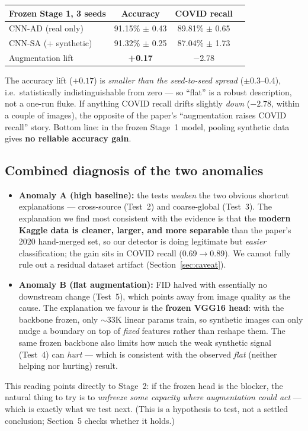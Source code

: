\documentclass[11pt]{article}
\begin{document}
\begin{table}[htbp]
\centering
\begin{tabular}{@{}lccc@{}}
\toprule
\textbf{Frozen Stage 1, 3 seeds} & \textbf{Accuracy} & \textbf{COVID recall} & \\
\midrule
CNN-AD (real only)   & 91.15\% $\pm$ 0.43 & 89.81\% $\pm$ 0.65 & \\
CNN-SA (+ synthetic) & 91.32\% $\pm$ 0.25 & 87.04\% $\pm$ 1.73 & \\
Augmentation lift    & \textbf{+0.17} & $-$2.78 & \\
\bottomrule
\end{tabular}
\end{table}

\noindent The accuracy lift ($+0.17$) is \emph{smaller than the seed-to-seed
spread} ($\pm$0.3--0.4), i.e.\ statistically indistinguishable from zero --- so
``flat'' is a robust description, not a one-run fluke. If anything COVID recall
drifts slightly \emph{down} ($-2.78$, within a couple of images), the opposite of
the paper's ``augmentation raises COVID recall'' story. Bottom line: in the frozen
Stage~1 model, pooling synthetic data gives \textbf{no reliable accuracy gain}.

\subsection{Combined diagnosis of the two anomalies}
\label{sec:diagnosis}
\begin{itemize}[nosep,leftmargin=1.4em]
  \item \textbf{Anomaly A (high baseline):} the tests \emph{weaken} the two obvious
        shortcut explanations --- cross-source (Test~2) and coarse-global (Test~3).
        The explanation we find most consistent with the evidence is that the
        \textbf{modern Kaggle data is cleaner, larger, and more separable} than the
        paper's 2020 hand-merged set, so our detector is doing legitimate but
        \emph{easier} classification; the gain sits in COVID recall
        (0.69$\to$0.89). We cannot fully rule out a residual dataset artifact
        (Section~\ref{sec:caveat}).
  \item \textbf{Anomaly B (flat augmentation):} FID halved with essentially no
        downstream change (Test~5), which points away from image quality as the
        cause. The explanation we favour is the \textbf{frozen VGG16 head}: with the
        backbone frozen, only $\sim$33K linear params train, so synthetic images can
        only nudge a boundary on top of \emph{fixed} features rather than reshape
        them. The same frozen backbone also limits how much the weak synthetic
        signal (Test~4) can \emph{hurt} --- which is consistent with the observed
        \emph{flat} (neither helping nor hurting) result.
\end{itemize}
\noindent This reading points directly to Stage~2: if the frozen head is the
blocker, the natural thing to try is to \emph{unfreeze some capacity where
augmentation could act} --- which is exactly what we test next. (This is a
hypothesis to test, not a settled conclusion; Section~5 checks whether it holds.)
\end{document}
